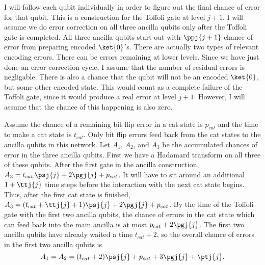 I will follow each qubit individually in order to figure out the final chance
of error for that qubit.  This is a construction for the Toffoli gate at level
$j+1$.  I will assume we do error correction on all three ancilla qubits only
after the Toffoli gate is completed.  All three ancilla qubits start out with
$\ppj{j+1}$ chance of error from preparing encoded $\ket{0}$'s.  There are
actually two types of relevant encoding errors.  There can be errors
remaining at lower levels.  Since we have just done an error correction
cycle, I assume that the number of residual errors is negligable.  There is
also a chance that the qubit will not be an encoded $\ket{0}$, but some
other encoded state.  This would count as a complete failure of the Toffoli
gate, since it would produce a real error at level $j+1$.  However, I will
assume that the chance of this happening is also zero.

Assume the chance of a remaining bit flip error in a cat state is $p_{cat}$
and the time to make a cat state is $t_{cat}$.  Only bit flip errors feed back
from the cat states to the ancilla qubits in this network.  Let $A_1$, $A_2$,
and $A_3$ be the accumulated chances of error in the three ancilla qubits.
First we have a Hadamard transform on all three of these qubits.  After the
first gate in the ancilla construction, $A_3 = t_{cat}\,\psj{j} + 2 \pgj{j} + p_{cat}$.  It will have to sit around an additional $1 + \ttj{j}$
time steps before the interaction with the next cat state begins.  Thus, after
the first cat state is finished, $A_3 = (t_{cat} + \ttj{j} + 1) \psj{j} +
2 \pgj{j} + p_{cat}$.  By the time of the Toffoli gate with the first two
ancilla qubits, the chance of errors in the cat state which can feed back into
the main ancilla is at most $p_{cat} + 2 \pgj{j}$.  The first two ancilla
qubits have already waited a time $t_{cat}+2$, so the overall chance of errors
in the first two ancilla qubits is
\begin{equation}
	A_1 = A_2 = (t_{cat}+2) \psj{j} + p_{cat} + 3 \pgj{j} + \ptj{j}.
\end{equation}

